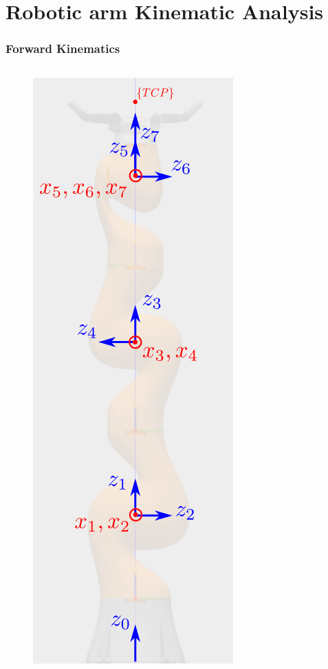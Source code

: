 \section{Robotic arm Kinematic Analysis}

\begin{frame}
\frametitle{Forward Kinematics}
\begin{columns}
\begin{figure}[htbp]
\centering
\includegraphics[width=\textwidth]{../images/iiwa-frames.png}

\end{figure}
\end{columns}
\end{frame}
